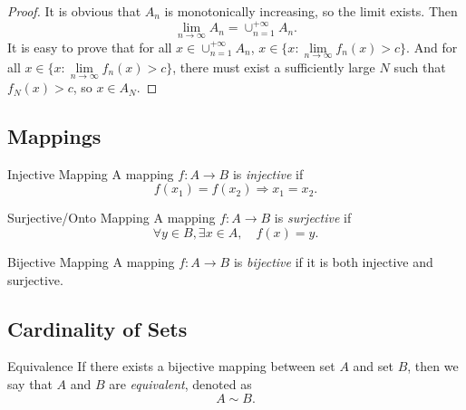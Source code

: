 \begin{proof}
  It is obvious that $A_n$ is monotonically increasing, so the limit exists.
  Then
  \begin{equation}
    \lim \limits _{n \rightarrow \infty} A_n = \cup _{n = 1}^{+\infty}A_n.
  \end{equation}
  It is easy to prove that for all $x \in \cup _{n = 1}^{+\infty}A_n$,
  $x \in \{x: \lim \limits _{n \rightarrow \infty} f_n(x) > c\}$.
  And for all $x \in \{x: \lim \limits _{n \rightarrow \infty} f_n(x) > c\}$,
  there must exist a sufficiently large $N$ such that $f_N(x) > c$,
  so $x \in A_N$.
\end{proof}

\subsection{Mappings}

\begin{definition}{Injective Mapping}{}
  A mapping $f:A \rightarrow B$ is \emph{injective} if
  \begin{equation}
    f(x_1) = f(x_2) \Rightarrow x_1 = x_2.
  \end{equation}
\end{definition}

\begin{definition}{Surjective/Onto Mapping}{}
  A mapping $f:A \rightarrow B$ is \emph{surjective} if
  \begin{equation}
    \forall y \in B, \exists x \in A, \quad f(x) = y.
  \end{equation}
\end{definition}

\begin{definition}{Bijective Mapping}{}
  A mapping $f:A \rightarrow B$ is \emph{bijective} if it is both injective and surjective.
\end{definition}

\subsection{Cardinality of Sets}

\begin{definition}{Equivalence}{}
  If there exists a bijective mapping between set $A$ and set $B$,
  then we say that $A$ and $B$ are \emph{equivalent}, denoted as
  \begin{equation}
    A \sim B.
  \end{equation}
\end{definition}

